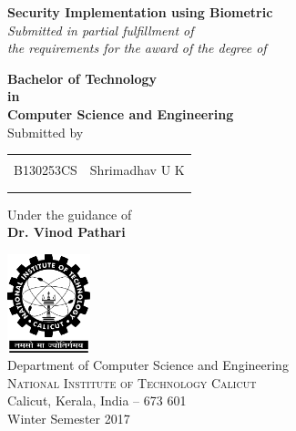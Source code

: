 \begin{titlepage}

\begin{center}


\Large \textbf {Security Implementation using Biometric}\\[0.5in]

       \small \emph{Submitted in partial fulfillment of\\
        the requirements for the award of the degree of}
        \vspace{.2in}

       {\bf Bachelor of Technology \\in\\ Computer Science and Engineering}\\[0.5in]

\normalsize Submitted by \\
\begin{table}[h]
\centering
\begin{tabular}{lr}\hline \\
B130253CS & Shrimadhav U K \\ \\ \hline
\\
\end{tabular}
\end{table}

\vspace{.1in}
Under the guidance of\\
{\textbf{Dr. Vinod Pathari}}\\[0.2in]

\vfill

\includegraphics[width=0.18\textwidth]{./nitc-logo}\\[0.1in]
\Large{Department of Computer Science and Engineering}\\
\normalsize
\textsc{National Institute of Technology Calicut}\\
Calicut, Kerala, India -- 673 601 \\
\vspace{0.2cm}
Winter Semester 2017

\end{center}

\end{titlepage}
